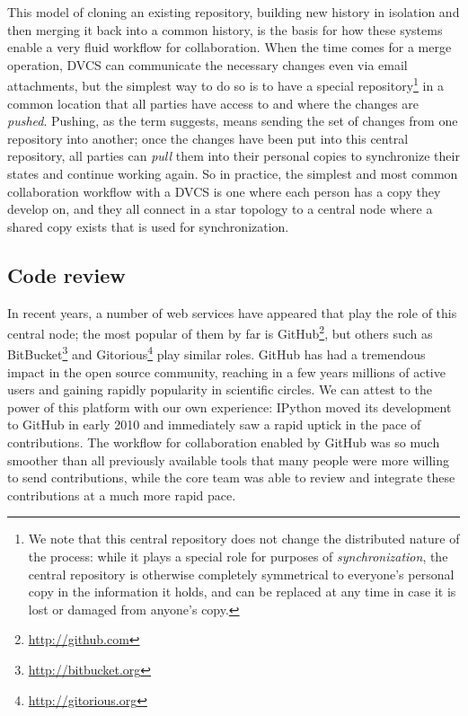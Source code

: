 \documentclass[ChapterTOCs,krantz2]{krantz} %
\begin{document}
This model of cloning an existing repository, building new history in isolation
and then merging it back into a common history, is the basis for how these
systems enable a very fluid workflow for collaboration.  When the time comes for
a merge operation, DVCS can communicate the necessary changes even
via email attachments, but the simplest way to do so is to have a special
repository\footnote{We note that this central repository does not change the
  distributed nature of the process: while it plays a special role for purposes
  of \emph{synchronization}, the central repository is otherwise completely
  symmetrical to everyone's personal copy in the information it holds, and can
  be replaced at any time in case it is lost or damaged from anyone's copy.} in
a common location that all parties have access to and where the changes are
\emph{pushed}.  Pushing, as the term suggests, means sending the set of
changes from one repository into another; once the changes have been put into
this central repository, all parties can \emph{pull} them into their personal
copies to synchronize their states and continue working again.  So in practice,
the simplest and most common collaboration workflow with a DVCS is one where
each person has a copy they develop on, and they all connect in a star topology
to a central node where a shared copy exists that is used for synchronization.

\subsection{Code review}\label{subsec:code_review}

In recent years, a number of web services have appeared that play the role of
this central node; the most popular of them by far is
GitHub\footnote{\url{http://github.com}}, but others such as
BitBucket\footnote{\url{http://bitbucket.org}} and
Gitorious\footnote{\url{http://gitorious.org}} play similar roles.  GitHub has
had a tremendous impact in the open source community, reaching in a few years
millions of active users and gaining rapidly popularity in scientific circles.
We can attest to the power of this platform with our own experience:
IPython moved its development to GitHub in early 2010 and
immediately saw a rapid uptick in the pace of contributions.  The workflow for
collaboration enabled by GitHub was so much smoother than all previously
available tools that many people were more willing to send contributions, while
the core team was able to review and integrate these contributions at a much
more rapid pace.
\end{document}
